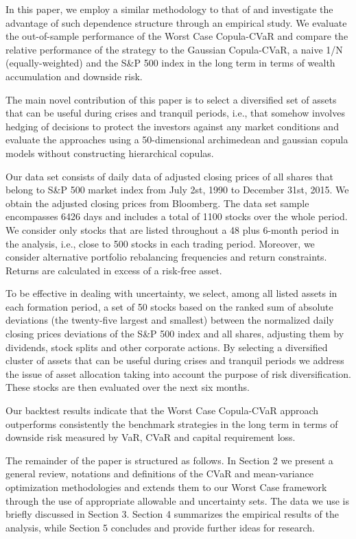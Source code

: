 \documentclass[a4paper,12pt]{report}
\begin{document}
In this paper, we employ a similar methodology to that of \citet*{kakouris14}
and investigate the advantage of such dependence structure through an
empirical study. We evaluate the out-of-sample performance of the Worst Case Copula-CVaR and compare the relative performance of the strategy to the Gaussian Copula-CVaR, a naive 1/N (equally-weighted) and the S\&P 500
index in the long term in terms of wealth accumulation and downside risk.

The main novel contribution of this paper is to select a diversified set of assets that can be useful during crises and tranquil periods, i.e., that somehow involves hedging of decisions to protect the investors against any market conditions and evaluate the approaches using a 50-dimensional archimedean and gaussian copula models without constructing hierarchical copulas.  

Our data set consists of daily data of adjusted closing prices of all
shares that belong to S\&P 500 market index from July 2st, 1990 to December
31st, 2015. We obtain the adjusted closing prices from Bloomberg. The data
set sample encompasses 6426 days and includes a total of 1100 stocks over
the whole period. We consider only stocks that are listed throughout a 48
plus 6-month period in the analysis, i.e., close to 500 stocks in each
trading period. Moreover, we consider alternative portfolio rebalancing
frequencies and return constraints. Returns are calculated in excess of a risk-free asset.

To be effective in
dealing with uncertainty, we select, among all listed assets in each
formation period, a set of 50 stocks based on the ranked sum of absolute
deviations (the twenty-five largest and smallest) between the normalized
daily closing prices deviations of the S\&P 500 index
and all shares, adjusting them by dividends, stock splits and other
corporate actions. By selecting a diversified cluster of assets that can be
useful during crises and tranquil periods we address the issue of asset
allocation taking into account the purpose of risk diversification. These
stocks are then evaluated over the next six months.

Our backtest results indicate
that the Worst Case Copula-CVaR approach outperforms consistently the
benchmark strategies in the long term in terms of downside risk measured by VaR, CVaR and capital requirement loss. 

The remainder of the paper is structured as follows. In Section 2 we present
a general review, notations and definitions of the CVaR and mean-variance
optimization methodologies and extends them to our Worst Case framework
through the use of appropriate allowable and uncertainty sets. The data we
use is briefly discussed in Section 3. Section 4 summarizes the empirical
results of the analysis, while Section 5 concludes and provide further ideas
for research.
\end{document}
